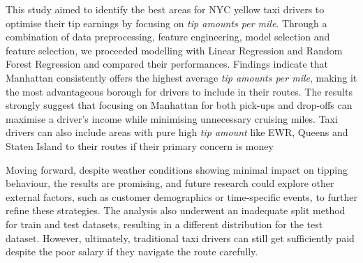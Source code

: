 \documentclass[11pt]{article}
\begin{document}
This study aimed to identify the best areas for NYC yellow taxi drivers to optimise their tip earnings by focusing on \textit{tip amounts per mile}. Through a combination of data preprocessing, feature engineering, model selection and feature selection, we proceeded modelling with Linear Regression and Random Forest Regression and compared their performances. Findings indicate that Manhattan consistently offers the highest average \textit{tip amounts per mile}, making it the most advantageous borough for drivers to include in their routes. The results strongly suggest that focusing on Manhattan for both pick-ups and drop-offs can maximise a driver's income while minimising unnecessary cruising miles. Taxi drivers can also include areas with pure high \textit{tip amount} like EWR, Queens and Staten Island to their routes if their primary concern is money

Moving forward, despite weather conditions showing minimal impact on tipping behaviour, the results are promising, and future research could explore other external factors, such as customer demographics or time-specific events, to further refine these strategies. The analysis also underwent an inadequate split method for train and test datasets, resulting in a different distribution for the test dataset. However, ultimately, traditional taxi drivers can still get sufficiently paid despite the poor salary\cite{taxi_driver_salary} if they navigate the route carefully.

\clearpage

\printbibliography
\end{document}
